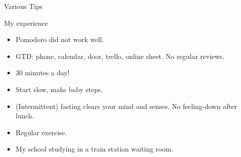 \begin{frame}{Various Tips}
  \begin{block}{My experience}
    \begin{itemize}
      \item Pomodoro did not work well. %
      \item GTD: phone, calendar, door, trello, online sheet. No regular reviews.
      \item 30 minutes a day!
      \item Start slow, make baby steps. %
      \item (Intermittent) fasting clears your mind and senses. No feeling-down after lunch.
      \item Regular exercise.
      \item My school studying in a train station waiting room.
    \end{itemize}
  \end{block}
\end{frame}

